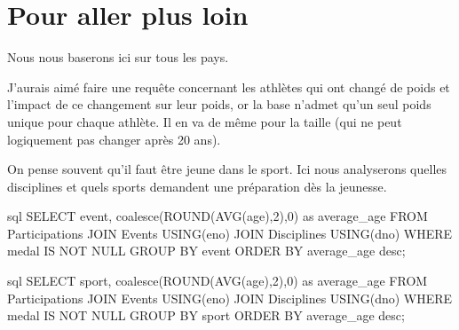 \documentclass{mytex}
\begin{document}

\section{Pour aller plus loin}


Nous nous baserons ici sur tous les pays.


J'aurais aimé faire une requête concernant les athlètes qui ont changé de poids et l'impact de ce changement sur leur poids, or la base n'admet qu'un seul poids unique pour chaque athlète. Il en va de même pour la taille (qui ne peut logiquement pas changer après 20 ans).


On pense souvent qu'il faut être jeune dans le sport. Ici nous analyserons quelles disciplines et quels sports demandent une préparation dès la jeunesse.


\begin{codeboxlang}[title=Age moyen des médaillés par discipline]{sql}
	SELECT event, coalesce(ROUND(AVG(age),2),0) as average_age
	FROM Participations
	JOIN Events USING(eno)
	JOIN Disciplines USING(dno)
	WHERE medal IS NOT NULL
	GROUP BY event
	ORDER BY average_age desc;
\end{codeboxlang}



\begin{codeboxlang}[title=Age moyen des médaillés par sport]{sql}
	SELECT sport, coalesce(ROUND(AVG(age),2),0) as average_age
	FROM Participations
	JOIN Events USING(eno)
	JOIN Disciplines USING(dno)
	WHERE medal IS NOT NULL
	GROUP BY sport
	ORDER BY average_age desc;
\end{codeboxlang}
\end{document}
